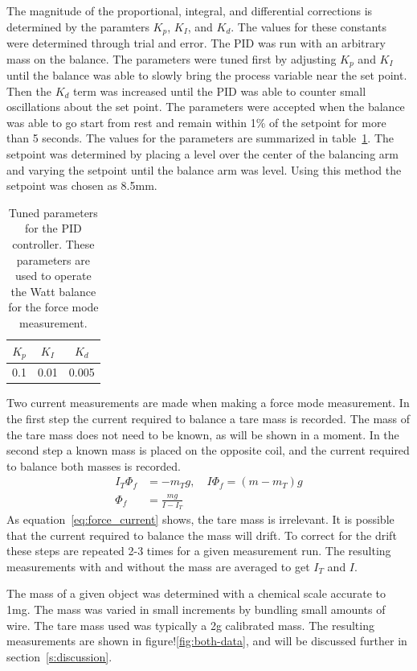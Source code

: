 \documentclass[aps,prstab,reprint,12pt]{revtex4-1}
\begin{document}
The magnitude of the proportional, integral, and differential corrections is determined by the paramters $K_p$, $K_I$, and $K_d$. The values for these constants were determined through trial and error. The PID was run with an arbitrary mass on the balance.
The parameters were tuned first by adjusting $K_p$ and $K_I$ until the balance was able to slowly bring the process variable near the set point.
Then the $K_d$ term was increased until the PID was able to counter small oscillations about the set point. The parameters were accepted when the balance was able to go start from rest and remain within 1\% of the setpoint for more than 5 seconds. The values for the parameters are summarized in table~\ref{tab:pid}. The setpoint was determined by placing a level over the center of the balancing arm and varying the setpoint until the balance arm was level. Using this method the setpoint was chosen as 8.5mm.

\begin{table}
    \centering
    \begin{tabular}{|c|c|c|}\hline
        $K_p$ & $K_I$ & $K_d$ \\\hline
        0.1 & 0.01 & 0.005 \\\hline
    \end{tabular}
    \caption{Tuned parameters for the PID controller. These parameters are used to operate the Watt balance for the force mode measurement.}
    \label{tab:pid}
\end{table}

Two current measurements are made when making a force mode measurement. In the first step the current required to balance a tare mass is recorded. The mass of the tare mass does not need to be known, as will be shown in a moment. In the second step a known mass is placed on the opposite coil, and the current required to balance both masses is recorded. 
\begin{align}
    I_T \Phi_f &= -m_T g ,\quad I \Phi_f = (m-m_T)g \nonumber \\
    \Phi_f &= \frac{mg}{I-I_T} \label{eq:force_current}
\end{align}
As equation~\ref{eq:force_current} shows, the tare mass is irrelevant. It is possible that the current required to balance the mass will drift. To correct for the drift these steps are repeated 2-3 times for a given measurement run. The resulting measurements with and without the mass are averaged to get $I_T$ and $I$.

The mass of a given object was determined with a chemical scale accurate to 1mg. The mass was varied in small increments by bundling small amounts of wire. The tare mass used was typically a 2g calibrated mass. The resulting measurements are shown in figure!\ref{fig:both-data}, and will be discussed further in section~\ref{s:discussion}.
\end{document}
